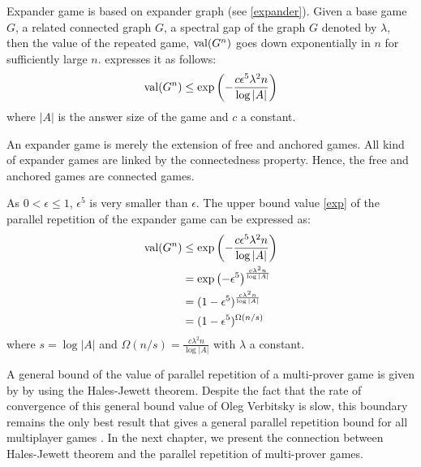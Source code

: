 Expander game is based on expander graph (see \eqref{expander}).  Given a base game $G$, a related connected graph $G$, a spectral gap of the graph $G$ denoted by $\lambda$,  then the value of the repeated game, $\mathrm{val} (G^n)$  goes down exponentially in $n$ for sufficiently large $n$. \cite{dinur2016multiplayer} expresses it as follows:
\begin{align}
\mathrm{val} (G^n) \leq \exp \left(-\frac{c \epsilon^5 \lambda^2 n }{\log |A|}\right) \label{exp}
\end{align}
where $|A|$ is the answer size of the game and $c$ a constant.

An expander game is  merely the extension of free and anchored games. All kind of expander games are linked by the connectedness property. Hence, the free and anchored games are connected games. 

As $0 < \epsilon \leq 1$, $\epsilon^5$ is very smaller than $\epsilon$. The upper bound value \eqref{exp} of the parallel repetition of the expander game can be expressed as:
\begin{align*}
\mathrm{val} (G^n) & \leq \exp \left(-\frac{c \epsilon^5 \lambda^2 n }{\log |A|}\right) \\
& =\exp \left(-\epsilon^5\right)^{\frac{c  \lambda^2 n }{\log |A|}} \\
& =(1-\epsilon^5)^{ \frac{c  \lambda^2 n }{\log |A|}} \\
& =(1-\epsilon^5)^{ \Omega(n/s)}
\end{align*}
where $s=\log |A|$ and $\Omega(n/s)=\frac{c  \lambda^2 n }{\log |A|}$ with  $\lambda$ a constant.

A general bound of the value of parallel repetition of a multi-prover game is  given by  \cite{verbitsky1996towards} by using the Hales-Jewett theorem. Despite the fact that the rate of  convergence of this general bound value of Oleg Verbitsky is slow, this boundary  remains the only best result that gives a general parallel repetition bound for all multiplayer games \citep{hkazla2016forbidden,dinur2016multiplayer}. In the next chapter, we present the connection between Hales-Jewett theorem and the parallel repetition of  multi-prover games. 

 
 